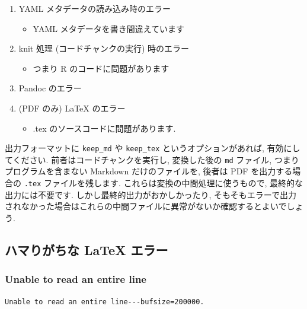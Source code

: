 \documentclass[
]{ltjsarticle}
\providecommand{\tightlist}{%
  \setlength{\itemsep}{0pt}\setlength{\parskip}{0pt}}
\begin{document}
\begin{enumerate}
\def\labelenumi{\arabic{enumi}.}
\tightlist
\item
  YAML メタデータの読み込み時のエラー

  \begin{itemize}
  \tightlist
  \item
    YAML メタデータを書き間違えています
  \end{itemize}
\item
  knit 処理 (コードチャンクの実行) 時のエラー

  \begin{itemize}
  \tightlist
  \item
    つまり R のコードに問題があります
  \end{itemize}
\item
  Pandoc のエラー
\item
  (PDF のみ) LaTeX のエラー

  \begin{itemize}
  \tightlist
  \item
    .tex のソースコードに問題があります.
  \end{itemize}
\end{enumerate}

出力フォーマットに \texttt{keep\_md} や \texttt{keep\_tex} というオプションがあれば, 有効にしてください. 前者はコードチャンクを実行し, 変換した後の \texttt{md} ファイル, つまりプログラムを含まない Markdown だけのファイルを, 後者は PDF を出力する場合の \texttt{.tex} ファイルを残します. これらは変換の中間処理に使うもので, 最終的な出力には不要です. しかし最終的出力がおかしかったり, そもそもエラーで出力されなかった場合はこれらの中間ファイルに異常がないか確認するとよいでしょう.

\hypertarget{ux30cfux30deux308aux304cux3061ux306a-latex-ux30a8ux30e9ux30fc}{%
\subsection{ハマりがちな LaTeX エラー}\label{ux30cfux30deux308aux304cux3061ux306a-latex-ux30a8ux30e9ux30fc}}

\hypertarget{unable-to-read-an-entire-line}{%
\subsubsection{Unable to read an entire line}\label{unable-to-read-an-entire-line}}

\begin{verbatim}
Unable to read an entire line---bufsize=200000.
\end{verbatim}
\end{document}
